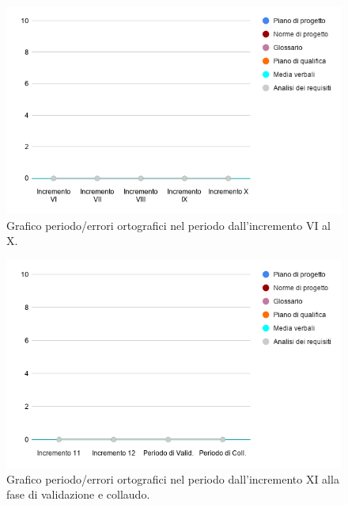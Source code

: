\begin{figure}[H]
	\centering
	\includegraphics[width=0.8\linewidth]{./res/images/ortografia_3.png}
	\caption{Grafico periodo/errori ortografici nel periodo dall'incremento VI al X.}
	\label{fig:Grafico errori ortografici durante il periodo dall'incremento VI al X.}
\end{figure}
\begin{figure}[H]
	\centering
	\includegraphics[width=0.8\linewidth]{./res/images/ortografia_4.png}
	\caption{Grafico periodo/errori ortografici nel periodo dall'incremento XI alla fase di validazione e collaudo.}
	\label{fig:Grafico errori ortografici durante il periodo dall'incremento XI alla fase di validazione e collaudo.}
\end{figure}

